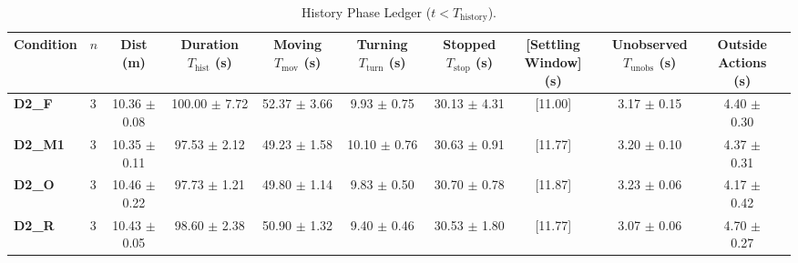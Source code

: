 \documentclass[10pt]{article}
\begin{document}
\begin{table}[t]
\centering
\footnotesize
\caption{History Phase Ledger ($t < T_{\text{history}}$).}
\label{tab:ledger_hist}
\setlength{\tabcolsep}{2.8pt}
\begin{tabular*}{\textwidth}{@{\extracolsep{\fill}}llccccccccc@{}}
\toprule
Condition & $n$ & \shortstack{Dist\\(m)} & \shortstack{Duration\\$T_{\text{hist}}$ (s)} & \shortstack{Moving\\$T_{\text{mov}}$ (s)} & \shortstack{Turning\\$T_{\text{turn}}$ (s)} & \shortstack{Stopped\\$T_{\text{stop}}$ (s)} & \shortstack{[Settling\\Window] (s)} & \shortstack{Unobserved\\$T_{\text{unobs}}$ (s)} & \shortstack{Outside\\Actions (s)} \\
\midrule
\textbf{D2\_F}  & 3 & 10.36 $\pm$ 0.08 & 100.00 $\pm$ 7.72 & 52.37 $\pm$ 3.66 & 9.93 $\pm$ 0.75 & 30.13 $\pm$ 4.31 & [11.00] & 3.17 $\pm$ 0.15 & 4.40 $\pm$ 0.30 \\
\textbf{D2\_M1} & 3 & 10.35 $\pm$ 0.11 & 97.53 $\pm$ 2.12  & 49.23 $\pm$ 1.58 & 10.10 $\pm$ 0.76 & 30.63 $\pm$ 0.91 & [11.77] & 3.20 $\pm$ 0.10 & 4.37 $\pm$ 0.31 \\
\textbf{D2\_O}  & 3 & 10.46 $\pm$ 0.22 & 97.73 $\pm$ 1.21  & 49.80 $\pm$ 1.14 & 9.83 $\pm$ 0.50  & 30.70 $\pm$ 0.78 & [11.87] & 3.23 $\pm$ 0.06 & 4.17 $\pm$ 0.42 \\
\textbf{D2\_R}  & 3 & 10.43 $\pm$ 0.05 & 98.60 $\pm$ 2.38  & 50.90 $\pm$ 1.32 & 9.40 $\pm$ 0.46  & 30.53 $\pm$ 1.80 & [11.77] & 3.07 $\pm$ 0.06 & 4.70 $\pm$ 0.27 \\
\bottomrule
\end{tabular*}
\end{table}
\end{document}

